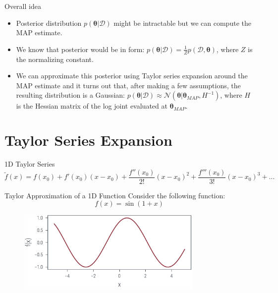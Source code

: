 \documentclass{beamer}
\begin{document}
\begin{frame}{Overall idea}
    \begin{itemize}
        \item Posterior distribution $p(\boldsymbol{\theta}| \mathcal{D})$ might be intractable but we can compute the MAP estimate.
        \item We know that posterior would be in form: $p(\boldsymbol{\theta}| \mathcal{D}) = \frac{1}{Z}p(\mathcal{D}, \boldsymbol{\theta})$, where $Z$ is the normalizing constant.
        \item We can approximate this posterior using Taylor series expansion around the MAP estimate and it turns out that, after making a few assumptions, the resulting distribution is a Gaussian: $p(\boldsymbol{\theta}| \mathcal{D}) \approx \mathcal{N}(\boldsymbol{\theta}|\boldsymbol{\theta}_{MAP}, H^{-1})$, where $H$ is the Hessian matrix of the log joint evaluated at $\boldsymbol{\theta}_{MAP}$.
    \end{itemize}
\end{frame}

\section{Taylor Series Expansion}

\begin{frame}{1D Taylor Series}
    \begin{equation*}
        \tilde{f}(x) = f(x_0) + f'(x_0)(x-x_0) + \frac{f''(x_0)}{2!}(x-x_0)^2 + \frac{f'''(x_0)}{3!}(x-x_0)^3 + \dots
    \end{equation*}

\end{frame}

\begin{frame}{Taylor Approximation of a 1D Function}
    Consider the following function:
    \begin{equation*}
        f(x) = \sin(1+x)
    \end{equation*}
    \begin{figure}
        \includegraphics[width=0.8\textwidth]{../figures/laplace-approx/sin.pdf}
    \end{figure}

\end{frame}
\end{document}
